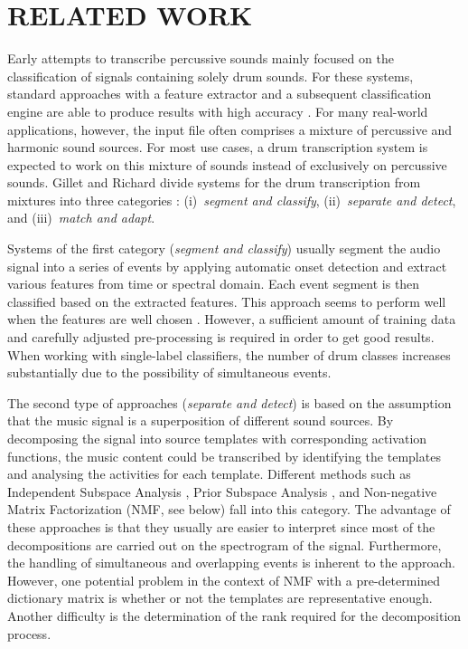 \documentclass{article}
\begin{document}
\section{RELATED WORK}\label{sec:related work}

Early attempts to transcribe percussive sounds mainly focused on the classification of signals containing solely drum sounds. For these systems, standard approaches with a feature extractor and a subsequent classification engine are able to produce results with high accuracy \cite{%
herrera_automatic_2003}. For many real-world applications, however, the input file often comprises a mixture of percussive and harmonic sound sources. For most use cases, a drum transcription system is expected to work on this mixture of sounds instead of exclusively on percussive sounds. 
Gillet and Richard divide systems for the drum transcription from mixtures into three categories \cite{gillet_transcription_2008}: (i)~\textit{segment and classify}, (ii)~\textit{separate and detect}, and (iii)~\textit{match and adapt}.  

Systems of the first category (\textit{segment and classify}) usually segment the audio signal into a series of events by applying automatic onset detection and extract various features from time or spectral domain. Each event segment is then classified based on the extracted features. 
This approach seems to perform well when the features are well chosen \cite{gillet_automatic_2004, dittmar_Drum_2005}. However, a sufficient amount of training data and carefully adjusted pre-processing is required in order to get good results. When working with single-label classifiers, the number of drum classes increases substantially due to the possibility of simultaneous events.

The second type of approaches (\textit{separate and detect}) is based on the assumption that the music signal is a superposition of different sound sources. By decomposing the signal into source templates with corresponding activation functions, the music content could be transcribed by identifying the templates and analysing the activities for each template. 
Different methods such as Independent Subspace Analysis \cite{fitzgerald_sub-band_2002}, Prior Subspace Analysis \cite{fitzgerald_Drum_2003}, and Non-negative Matrix Factorization (NMF, see below) \cite{moreau_Drum_2007,alves_Drum_2009} fall into this category. The advantage of these approaches is that they usually are easier to interpret since most of the decompositions are carried out on the spectrogram of the signal. Furthermore, the handling of simultaneous and overlapping events is inherent to the approach. However, one potential problem in the context of NMF with a pre-determined dictionary matrix is whether or not the templates are representative enough. Another difficulty is the determination of the rank required for the decomposition process. 
\end{document}
